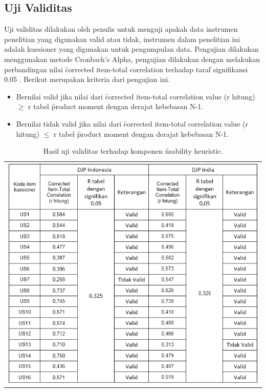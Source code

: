 \subsection{Uji Validitas}
Uji validitas dilakukan oleh penulis untuk menguji apakah data instrumen penelitian yang digunakan valid atau tidak, instrumen dalam penelitian ini adalah kuesioner yang digunakan untuk pengumpulan data. Pengujian dilakukan menggunakan metode Cronbach's Alpha, pengujian dilakukan dengan melakukan perbandingan nilai \f{corrected item-total correlation} terhadap taraf signifikansi 0.05 \citep{buku.riduwan}. Berikut merupakan kriteria dari pengujian ini.
\begin{itemize}
	\item Bernilai valid jika nilai dari \f{corrected item-total correlation value} (r hitung)  $\geq$ r tabel \f{product moment} dengan derajat kebebasan N-1.
	\item Bernilai tidak valid jika nilai dari \f{corrected item-total correlation value} (r hitung)  $\leq$ r tabel \f{product moment} dengan derajat kebebasan N-1.
\end{itemize}
\begin{table}
	\centering
	\caption{Hasil uji validitas terhadap komponen \f{usability heuristic}.}
	\label{tab:ujivaliditasuh}
	\begin{tabular}{c}
		\includegraphics[width=\textwidth]
		{pics/validitasUsabilityHeuristic.PNG}
\end{tabular}
\end{table}
